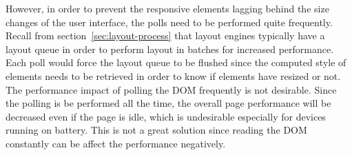 \documentclass[a4paper,11pt]{kth-mag}
\newcommand\abbr[2][]{\uppercase{#2}\ifthenelse{\equal{#1}{}}%
                     {}{#1}}
\begin{document}
          However, in order to prevent the responsive elements lagging behind the size changes of the user interface, the polls need to be performed quite frequently.
          Recall from section~\ref{sec:layout-process} that layout engines typically have a layout queue in order to perform layout in batches for increased performance.
          Each poll would force the layout queue to be flushed since the computed style of elements needs to be retrieved in order to know if elements have resized or not.
          The performance impact of polling the \abbr{dom} frequently is not desirable.
          Since the polling is be performed all the time, the overall page performance will be decreased even if the page is idle, which is undesirable especially for devices running on battery.
          This is not a great solution since reading the \abbr{dom} constantly can be affect the performance negatively. 
\end{document}
